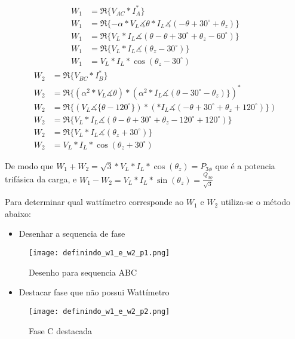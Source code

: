 \documentclass[a4paper, 12pt]{article}
\begin{document}
	\[\begin{split}
		W_1 &= \Re\{V_{AC} \ast I_A^\ast\}\\
		W_1 &= \Re\{-\alpha \ast V_L\measuredangle{\theta} \ast I_L\measuredangle{(-\theta+30^\circ+\theta_z)}\}\\
		W_1 &= \Re\{V_L\ast I_L\measuredangle{(\theta-\theta+30^\circ+\theta_z - 60^\circ)}\}\\
		W_1 &= \Re\{V_L\ast I_L\measuredangle{(\theta_z - 30^\circ)}\}\\
		W_1 &= V_L\ast I_L \ast \cos(\theta _z - 30^\circ)
	\end{split}\]
	\[
	\begin{split}
		W_2 &= \Re\{V_{BC} \ast I_B^\ast\}\\
		W_2 &= \Re\{(\alpha^2 \ast V_L\measuredangle{\theta})\ast (\alpha^2 \ast I_L\measuredangle{(\theta-30^\circ-\theta_z)}\})^\ast\\
		W_2 &= \Re\{(V_L\measuredangle{\{\theta-120^\circ}\})\ast (\ast I_L\measuredangle{(-\theta+30^\circ+\theta_z+120^\circ)}\})\\
		W_2 &= \Re\{V_L\ast I_L\measuredangle{(\theta-\theta+30^\circ+\theta_z-120^\circ + 120^\circ)}\}\\
		W_2 &= \Re\{V_L\ast I_L\measuredangle{(\theta_z + 30^\circ)}\}\\
		W_2 &= V_L\ast I_L \ast \cos(\theta _z + 30^\circ)
	\end{split}\]
	
	De modo que $W_1 + W_2 = \sqrt{3}*V_L*I_L*\cos(\theta_z) =P_{3\phi} $ que é a potencia trifásica da carga, e $W_1 - W_2 = V_L*I_L*\sin(\theta_z) = \frac{Q_{3\phi}}{\sqrt{3}}$
	
	Para determinar qual wattímetro corresponde ao $W_1$ e $W_2$ utiliza-se o método abaixo:
	\newpage
	\begin{itemize}
		\item Desenhar a sequencia de fase
	\end{itemize}
	\begin{figure}[H]
		\centering %
		\texttt{[image: definindo\_w1\_e\_w2\_p1.png]}
		\caption{Desenho para sequencia ABC}
	\end{figure}
	\begin{itemize}
		\item Destacar fase que não possui Wattímetro
	\end{itemize}
	\begin{figure}[H]
		\centering %
		\texttt{[image: definindo\_w1\_e\_w2\_p2.png]}
		\caption{Fase C destacada}
	\end{figure}
	
\end{document}
